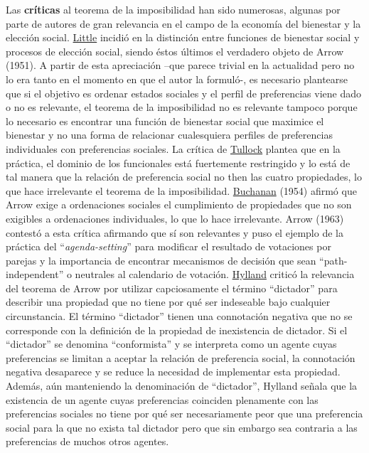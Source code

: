 \documentclass{nuevotema}
\begin{document}
Las \textbf{críticas} al teorema de la imposibilidad han sido numerosas, algunas por parte de autores de gran relevancia en el campo de la economía del bienestar y la elección social. \underline{Little} incidió en la distinción entre funciones de bienestar social y procesos de elección social, siendo éstos últimos el verdadero objeto de Arrow (1951). A partir de esta apreciación --que parece trivial en la actualidad pero no lo era tanto en el momento en que el autor la formuló-, es necesario plantearse que si el objetivo es ordenar estados sociales y el perfil de preferencias viene dado o no es relevante, el teorema de la imposibilidad no es relevante tampoco porque lo necesario es encontrar una función de bienestar social que maximice el bienestar y no una forma de relacionar cualesquiera perfiles de preferencias individuales con preferencias sociales. La crítica de \underline{Tullock} plantea que en la práctica, el dominio de los funcionales está fuertemente restringido y lo está de tal manera que la relación de preferencia social no then las cuatro propiedades, lo que hace irrelevante el teorema de la imposibilidad. \underline{Buchanan} (1954) afirmó que Arrow exige a ordenaciones sociales el cumplimiento de propiedades que no son exigibles a ordenaciones individuales, lo que lo hace irrelevante. Arrow (1963) contestó a esta crítica afirmando que sí son relevantes y puso el ejemplo de la práctica del ``\textit{agenda-setting}'' para modificar el resultado de votaciones por parejas y la importancia de encontrar mecanismos de decisión que sean ``path-independent'' o neutrales al calendario de votación. \underline{Hylland} criticó la relevancia del teorema de Arrow por utilizar capciosamente el término ``dictador'' para describir una propiedad que no tiene por qué ser indeseable bajo cualquier circunstancia. El término ``dictador'' tienen una connotación negativa que no se corresponde con la definición de la propiedad de inexistencia de dictador. Si el ``dictador'' se denomina ``conformista'' y se interpreta como un agente cuyas preferencias se limitan a aceptar la relación de preferencia social, la connotación negativa desaparece y se reduce la necesidad de implementar esta propiedad. Además, aún manteniendo la denominación de ``dictador'', Hylland señala que la existencia de un agente cuyas preferencias coinciden plenamente con las preferencias sociales no tiene por qué ser necesariamente peor que una preferencia social para la que no exista tal dictador pero que sin embargo sea contraria a las preferencias de muchos otros agentes. 
\end{document}
